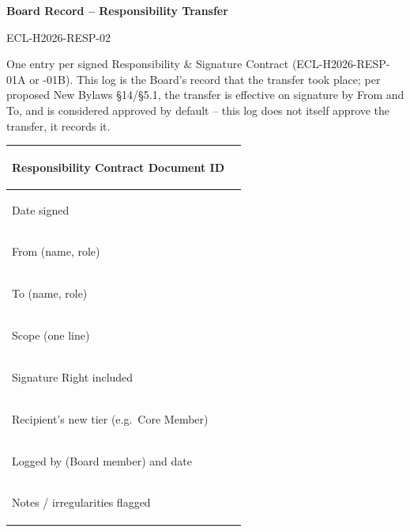 \documentclass{../../../Common/Latex/Templates/rapport}
\date{\meetingdate, \meetingtime}
\begin{document}
\reportmainmatter
\small
\setlength{\parindent}{0pt}
\setlength{\tabcolsep}{6pt}
\renewcommand{\arraystretch}{1.2}

\begin{center}
  {\Large\bfseries Board Record -- Responsibility Transfer}\par
  \vspace{0.15cm}
  {\normalsize ECL-H2026-RESP-02}\par
  \vspace{0.1cm}
  {\small \meetingline}\par
\end{center}

\vspace{0.2cm}
One entry per signed Responsibility \& Signature Contract (ECL-H2026-RESP-01A or -01B). This log is the Board's record that the transfer took place; per proposed New Bylaws \S14/\S5.1, the transfer is effective on signature by From and To, and is considered approved by default -- this log does not itself approve the transfer, it records it.

\vspace{0.4cm}
\begin{tabularx}{\textwidth}{|>{\bfseries\raggedright\arraybackslash}p{4cm}|X|}
  \hline
  Responsibility Contract Document ID      & \rule{0pt}{1cm}   \\
  \hline
  Date signed                              & \rule{0pt}{0.9cm} \\
  \hline
  From (name, role)                        & \rule{0pt}{0.9cm} \\
  \hline
  To (name, role)                          & \rule{0pt}{0.9cm} \\
  \hline
  Scope (one line)                         & \rule{0pt}{1cm}   \\
  \hline
  Signature Right included                 & \rule{0pt}{0.9cm} \\
  \hline
  Recipient's new tier (e.g.\ Core Member) & \rule{0pt}{0.9cm} \\
  \hline
  Logged by (Board member) and date        & \rule{0pt}{1.2cm} \\
  \hline
  Notes / irregularities flagged           & \rule{0pt}{1.6cm} \\
  \hline
\end{tabularx}
\end{document}

